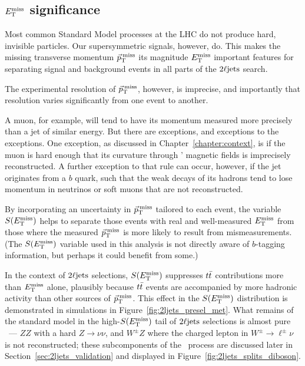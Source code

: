\subsection{\texorpdfstring{$E_\mathrm{T}^\mathrm{miss}$}{ETmiss} significance}
\label{sec:2ljets_metsig}
Most common Standard Model processes at the LHC do not produce hard,
invisible particles.
Our supersymmetric signals, however, do.
This makes the missing transverse momentum $\vec p_\mathrm{T}^\mathrm{\:miss}$ its magnitude $E_\mathrm{T}^\mathrm{miss}$
important features for separating signal and background events in all parts
of the $2\ell\mathrm{jets}$ search.

The experimental resolution of $\vec p_\mathrm{T}^\mathrm{\:miss}$, however, is imprecise, and
importantly that resolution varies significantly from one event to another.

A muon, for example, will tend to have its momentum measured more precisely
than a jet of similar energy.
But there are exceptions, and exceptions to the exceptions.
One exception, as discussed in Chapter~\ref{chapter:context}, is if the muon
is hard enough that its curvature through \atlas' magnetic fields is
imprecisely reconstructed.
A further exception to that rule can occur, however, if the jet originates from a
$b$ quark, such that the weak decays of its hadrons tend to lose momentum in
neutrinos or soft muons that are not reconstructed.

By incorporating an uncertainty in $\vec p_\mathrm{T}^\mathrm{\:miss}$ tailored to each event, the
variable $S(E_\mathrm{T}^\mathrm{miss})$ helps to separate those events with real and well-measured
$E_\mathrm{T}^\mathrm{miss}$ from those where the measured $\vec p_\mathrm{T}^\mathrm{\:miss}$ is more likely to result from
mismeasurements.
(The $S(E_\mathrm{T}^\mathrm{miss})$ variable used in this analysis is not directly
aware of $b$-tagging information, but perhaps it could benefit from some.)

In the context of $2\ell\mathrm{jets}$ selections, $S(E_\mathrm{T}^\mathrm{miss})$ suppresses $t\bar t$
contributions more than $E_\mathrm{T}^\mathrm{miss}$ alone, plausibly because $t\bar t$ events are
accompanied by more hadronic activity than other sources of $\vec p_\mathrm{T}^\mathrm{\:miss}$.
This effect in the $S(E_\mathrm{T}^\mathrm{miss})$ distribution is demonstrated in simulations in
Figure~\ref{fig:2ljets_presel_met}.
What remains of the standard model in the high-$S(E_\mathrm{T}^\mathrm{miss})$ tail of $2\ell\mathrm{jets}$
selections is almost pure \diboson\ --- $ZZ$ with a hard $Z\to \nu\nu$,
and $W^\pm Z$ where the charged lepton in $W^\pm\to\ell^\pm\nu$
is not reconstructed; these subcomponents of the \diboson\ process are discussed
later in Section~\ref{sec:2ljets_validation} and displayed in
Figure~\ref{fig:2ljets_splits_diboson}.

